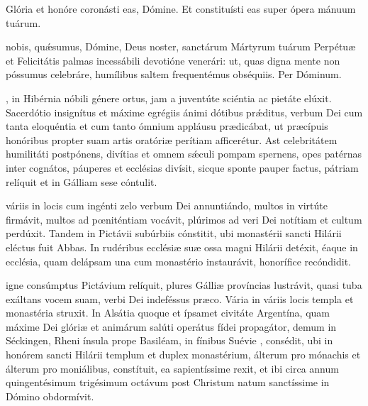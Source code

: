 \documentclass[fontsize=9pt,paper=A6,twoside,BCOR=1mm,DIV=22,headinclude]{scrarticle}
\begin{document}
\begin{multicols}{2}
{\V Glória et honóre coronásti eas, Dómine.
\R Et constituísti eas super ópera mánuum tuárum.

 nobis, quǽsumus, Dómine, Deus noster, sanctárum Mártyrum tuárum Perpétuæ et Felicitátis palmas incessábili devotióne venerári: ut, quas digna mente non póssumus celebráre, humílibus saltem frequentémus obséquiis. \red{(}Per Dóminum.\red{)}



}

{
, in Hibérnia nóbili génere ortus, jam a juventúte sciéntia ac pietáte elúxit. Sacerdótio insignítus et máxime egrégiis ánimi dótibus pr\'æditus, verbum Dei cum tanta eloquéntia et cum tanto ómnium appláusu prædicábat, ut præcípuis honóribus propter suam artis oratóriæ perítiam afficerétur. Ast celebritátem humilitáti postpónens, divítias et omnem s\'æculi pompam spernens, opes patérnas inter cognátos, páuperes et ecclésias divísit, sicque sponte pauper factus, pátriam relíquit et in Gálliam sese cóntulit.

\RVCiv 

 váriis in locis cum ingénti zelo verbum Dei annuntiándo, multos in virtúte firmávit, multos ad pœniténtiam vocávit, plúrimos ad veri Dei notítiam et cultum perdúxit. Tandem in Pictávii subúrbiis cónstitit, ubi monastérii sancti Hilárii eléctus fuit Abbas. In rudéribus ecclésiæ suæ ossa magni Hilárii detéxit, éaque in ecclésia, quam delápsam una cum monastério instaurávit, honorífice recóndidit.

}
{

\RVCv 

 igne consúmptus Pictávium relíquit, plures Gálliæ províncias lustrávit, quasi tuba exáltans vocem suam, verbi Dei indeféssus præco. Vária in váriis locis templa et monastéria struxit. In Alsátia quoque et ípsamet civitáte Argentína, quam máxime Dei glóriæ et animárum salúti operátus fídei propagátor, demum in Séckingen, Rheni ínsula prope Basiléam, in fínibus Suévie , consédit, ubi in honórem sancti Hilárii templum et duplex monastérium, álterum pro mónachis et álterum pro moniálibus, constítuit, ea sapientíssime rexit, et ibi circa annum quingentésimum trigésimum octávum post Christum natum sanctíssime in Dómino obdormívit.

}
\end{multicols}
\end{document}
